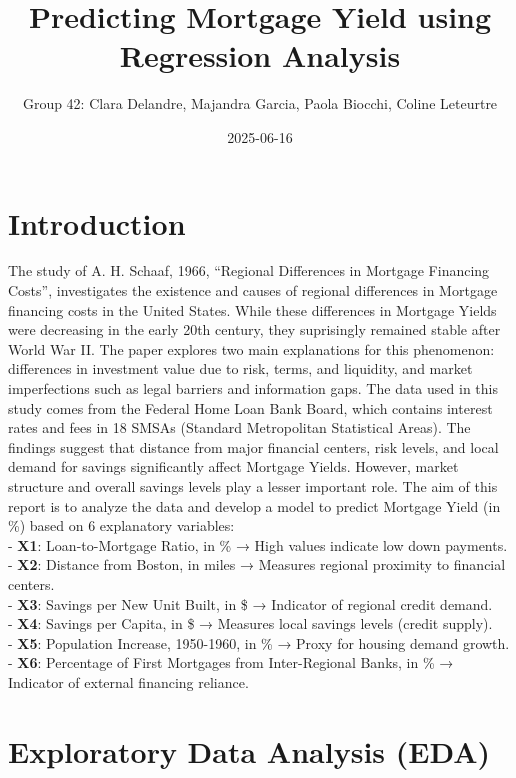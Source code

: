 \documentclass[
  12pt,
]{article}
\title{\textbf{Predicting Mortgage Yield using Regression Analysis}}
\author{Group 42: Clara Delandre, Majandra Garcia, Paola Biocchi, Coline
Leteurtre}
\date{2025-06-16}
\begin{document}
\maketitle

\section{Introduction}\label{introduction}

The study of A. H. Schaaf, 1966, ``Regional Differences in Mortgage
Financing Costs'', investigates the existence and causes of regional
differences in Mortgage financing costs in the United States. While
these differences in Mortgage Yields were decreasing in the early 20th
century, they suprisingly remained stable after World War II. The paper
explores two main explanations for this phenomenon: differences in
investment value due to risk, terms, and liquidity, and market
imperfections such as legal barriers and information gaps.
\vspace{0.5pt} The data used in this study comes from the Federal Home
Loan Bank Board, which contains interest rates and fees in 18 SMSAs
(Standard Metropolitan Statistical Areas). The findings suggest that
distance from major financial centers, risk levels, and local demand for
savings significantly affect Mortgage Yields. However, market structure
and overall savings levels play a lesser important role. \vspace{0.5pt}
The aim of this report is to analyze the data and develop a model to
predict Mortgage Yield (in \%) based on 6 explanatory variables:\\
- \textbf{X1}: Loan-to-Mortgage Ratio, in \% → High values indicate low
down payments.\\
- \textbf{X2}: Distance from Boston, in miles → Measures regional
proximity to financial centers.\\
- \textbf{X3}: Savings per New Unit Built, in \$ → Indicator of regional
credit demand.\\
- \textbf{X4}: Savings per Capita, in \$ → Measures local savings levels
(credit supply).\\
- \textbf{X5}: Population Increase, 1950-1960, in \% → Proxy for housing
demand growth.\\
- \textbf{X6}: Percentage of First Mortgages from Inter-Regional Banks,
in \% → Indicator of external financing reliance.

\section{Exploratory Data Analysis
(EDA)}\label{exploratory-data-analysis-eda}
\end{document}
